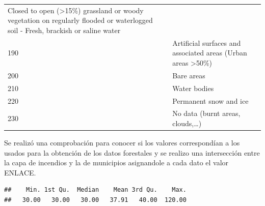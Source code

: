 \documentclass[11pt,]{article}
\begin{document}
\begin{longtable}[]{@{}ll@{}}
\begin{minipage}[t]{0.86\columnwidth}
Closed to open (\textgreater{}15\%) grassland or woody vegetation on
regularly flooded or waterlogged soil - Fresh, brackish or saline
water\strut
\end{minipage}\tabularnewline
\begin{minipage}[t]{0.08\columnwidth}\raggedright\strut
190\strut
\end{minipage} & \begin{minipage}[t]{0.86\columnwidth}\raggedright\strut
Artificial surfaces and associated areas (Urban areas
\textgreater{}50\%)\strut
\end{minipage}\tabularnewline
\begin{minipage}[t]{0.08\columnwidth}\raggedright\strut
200\strut
\end{minipage} & \begin{minipage}[t]{0.86\columnwidth}\raggedright\strut
Bare areas\strut
\end{minipage}\tabularnewline
\begin{minipage}[t]{0.08\columnwidth}\raggedright\strut
210\strut
\end{minipage} & \begin{minipage}[t]{0.86\columnwidth}\raggedright\strut
Water bodies\strut
\end{minipage}\tabularnewline
\begin{minipage}[t]{0.08\columnwidth}\raggedright\strut
220\strut
\end{minipage} & \begin{minipage}[t]{0.86\columnwidth}\raggedright\strut
Permanent snow and ice\strut
\end{minipage}\tabularnewline
\begin{minipage}[t]{0.08\columnwidth}\raggedright\strut
230\strut
\end{minipage} & \begin{minipage}[t]{0.86\columnwidth}\raggedright\strut
No data (burnt areas, clouds,\ldots{})\strut
\end{minipage}\tabularnewline
\bottomrule
\end{longtable}

Se realizó una comprobación para conocer si los valores correspondían a
los usados para la obtención de los datos forestales y se realizo una
intersección entre la capa de incendios y la de municipios asignandole a
cada dato el valor ENLACE.

\begin{verbatim}
##    Min. 1st Qu.  Median    Mean 3rd Qu.    Max. 
##   30.00   30.00   30.00   37.91   40.00  120.00
\end{verbatim}
\end{document}
